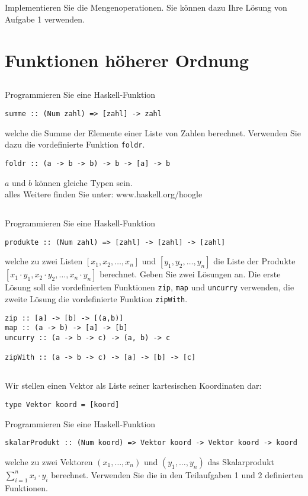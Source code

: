 \documentclass[
  10pt,                   %
  DIV12,
  german,                 %
  oneside,                %
  parskip=half,           %
  headings=normal,        %
  captions=tableheading,  %
]{scrartcl}
\begin{document}
\subsection{}
Implementieren Sie die Mengenoperationen. Sie können dazu Ihre Lösung von
Aufgabe 1 verwenden.

\section{Funktionen höherer Ordnung}
\subsection{}
Programmieren Sie eine Haskell-Funktion 

\begin{center}
\lstinline!summe :: (Num zahl) => [zahl] -> zahl!
\end{center}
welche die Summe der Elemente einer Liste von Zahlen berechnet. Verwenden Sie
dazu die vordefinierte Funktion \lstinline|foldr|.\\

\begin{center}
\lstinline!foldr :: (a -> b -> b) -> b -> [a] -> b!
\end{center}
$a$ und $b$ können gleiche Typen sein.\\
alles Weitere finden Sie unter: www.haskell.org/hoogle
\subsection{}
Programmieren Sie eine Haskell-Funktion 
\begin{center}
\lstinline!produkte :: (Num zahl) => [zahl] -> [zahl] -> [zahl]!
\end{center}
welche zu zwei Listen $[x_1, x_2, \ldots , x_n]$ und $[y_1, y_2, \ldots, y_n]$ die Liste der Produkte
$[x_1 \cdot y_1, x_2 \cdot y_2, \ldots, x_n \cdot y_n]$
berechnet. Geben Sie zwei Lösungen an. Die erste Lösung soll die vordefinierten
Funktionen \lstinline|zip|, \lstinline|map| und \lstinline|uncurry| verwenden, die zweite Lösung die vordefinierte
Funktion \lstinline|zipWith|.
\begin{lstlisting}
zip :: [a] -> [b] -> [(a,b)]
map :: (a -> b) -> [a] -> [b]
uncurry :: (a -> b -> c) -> (a, b) -> c

zipWith :: (a -> b -> c) -> [a] -> [b] -> [c]
\end{lstlisting}
\subsection{}
Wir stellen einen Vektor als Liste seiner kartesischen Koordinaten dar:
\begin{center}
\lstinline!type Vektor koord = [koord]!
\end{center}
Programmieren Sie eine Haskell-Funktion
\begin{center}
\lstinline!skalarProdukt :: (Num koord) => Vektor koord -> Vektor koord -> koord!
\end{center}
welche zu zwei Vektoren $(x_1, \ldots , x_n)$ und $(y_1, \ldots ,y_n)$ das Skalarprodukt
$\sum^n_{i=1}{x_i \cdot y_i}$ berechnet. Verwenden Sie die in den Teilaufgaben 1 und 2 definierten Funktionen.
\end{document}
